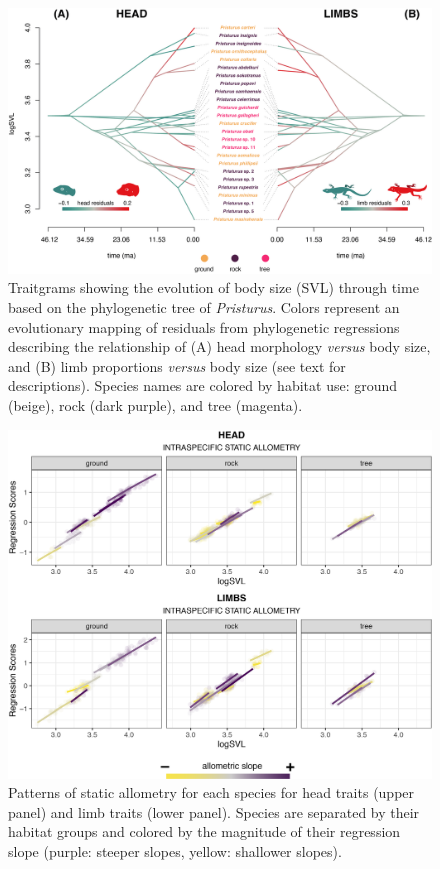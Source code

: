 \documentclass[
  11pt,
]{article}
\begin{document}
\begin{figure}

{\centering \includegraphics[width=1\linewidth]{Figs/figure_3_Pristurus_allometry_traitgram_legends} 

}

\caption{Traitgrams showing the evolution of body size (SVL) through time based on the phylogenetic tree of \textit{Pristurus}. Colors represent an evolutionary mapping of residuals from phylogenetic regressions describing the relationship of (A) head morphology \textit{versus} body size, and (B) limb proportions \textit{versus} body size (see text for descriptions). Species names are colored by habitat use: ground (beige), rock (dark purple), and tree (magenta).}\label{fig:unnamed-chunk-7}
\end{figure}

\newpage

\begin{figure}

{\centering \includegraphics[width=1\linewidth]{Figs/figure_4_static_allometry_v3} 

}

\caption{Patterns of static allometry for each species for head traits (upper panel) and limb traits (lower panel). Species are separated by their habitat groups and colored by the magnitude of their regression slope (purple: steeper slopes, yellow: shallower slopes).}\label{fig:unnamed-chunk-8}
\end{figure}
\end{document}
